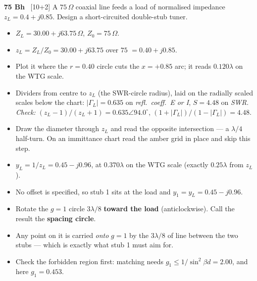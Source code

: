 \begin{asked}{\textbf{75 Bh} \ [10+2]}
A $75\,\Omega$ coaxial line feeds a load of normalised impedance $z_L = 0.4+j0.85$. Design a short-circuited double-stub tuner.
\end{asked}
\begin{itemize}
  \item $Z_L = 30.00 + j63.75\,\Omega$, $Z_0 = 75\,\Omega$.
\end{itemize}
\begin{itemize}
  \item $z_L = Z_L/Z_0 = 30.00 + j63.75$ over $75$ $=0.40 + j0.85$.
  \item Plot it where the $r = 0.40$ circle cuts the $x = +0.85$ arc; it reads $0.120\lambda$ on the WTG scale.
  \item Dividers from centre to $z_L$ (the SWR-circle radius), laid on the radially scaled scales below the chart: $|\Gamma_L| = 0.635$ on \emph{refl.\ coeff.\ E or I}, $S = 4.48$ on \emph{SWR}. \textit{Check:} $(z_L-1)/(z_L+1) = 0.635\angle 94.0^\circ$, $(1+|\Gamma_L|)/(1-|\Gamma_L|) = 4.48$.
\end{itemize}
\begin{itemize}
  \item Draw the diameter through $z_L$ and read the opposite intersection --- a $\lambda/4$ half-turn. On an immittance chart read the amber grid in place and skip this step.
  \item $y_L = 1/z_L = 0.45 - j0.96$, at $0.370\lambda$ on the WTG scale (exactly $0.25\lambda$ from $z_L$).
\end{itemize}
\begin{itemize}
  \item No offset is specified, so stub 1 sits at the load and $y_1 = y_L = 0.45 - j0.96$.
\end{itemize}
\begin{itemize}
  \item Rotate the $g=1$ circle $3\lambda/8$ \textbf{toward the load} (anticlockwise). Call the result the \textbf{spacing circle}.
  \item Any point on it is carried \emph{onto} $g=1$ by the $3\lambda/8$ of line between the two stubs --- which is exactly what stub 1 must aim for.
  \item Check the forbidden region first: matching needs $g_1 \le 1/\sin^2\beta d = 2.00$, and here $g_1 = 0.453$. \checkmark
\end{itemize}
